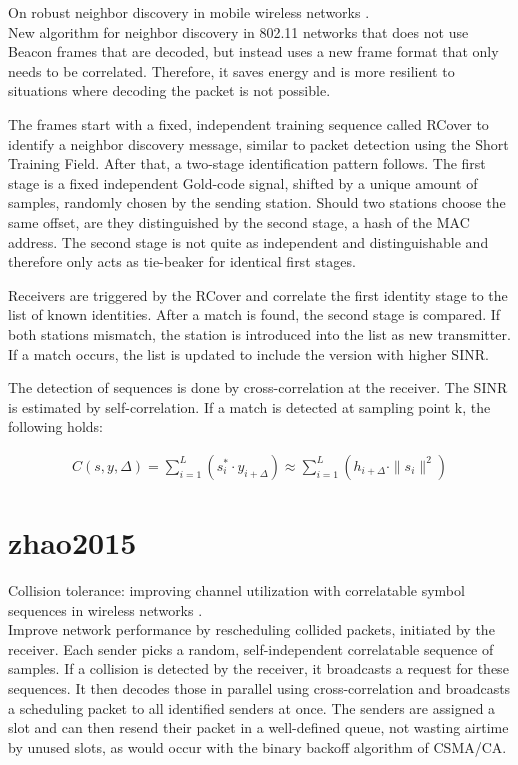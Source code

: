 On robust neighbor discovery in mobile wireless networks \cite{meng2015}.\\

New algorithm for neighbor discovery in 802.11 networks that does not use Beacon frames that are decoded, but instead uses a new frame format that only needs to be correlated. Therefore, it saves energy and is more resilient to situations where decoding the packet is not possible.

The frames start with a fixed, independent training sequence called RCover to identify a neighbor discovery message, similar to packet detection using the Short Training Field. After that, a two-stage identification pattern follows. The first stage is a fixed independent Gold-code signal, shifted by a unique amount of samples, randomly chosen by the sending station. Should two stations choose the same offset, are they distinguished by the second stage, a hash of the MAC address. The second stage is not quite as independent and distinguishable and therefore only acts as tie-beaker for identical first stages.

Receivers are triggered by the RCover and correlate the first identity stage to the list of known identities. After a match is found, the second stage is compared. If both stations mismatch, the station is introduced into the list as new transmitter. If a match occurs, the list is updated to include the version with higher SINR.

The detection of sequences is done by cross-correlation at the receiver. The SINR is estimated by self-correlation. If a match is detected at sampling point k, the following holds:

\begin{align}
	C(s,y,\Delta) = \sum_{i=1}^L (s_i^* \cdot y_{i+\Delta}) \approx \sum_{i=1}^L (h_{i+\Delta} \cdot \|s_i\|^2)
	\label{eqn:correlation}
\end{align}



\section*{zhao2015}

Collision tolerance: improving channel utilization with correlatable symbol sequences in wireless networks \cite{zhao2015}.\\

Improve network performance by rescheduling collided packets, initiated by the receiver. Each sender picks a random, self-independent correlatable sequence of samples. If a collision is detected by the receiver, it broadcasts a request for these sequences. It then decodes those in parallel using cross-correlation and broadcasts a scheduling packet to all identified senders at once. The senders are assigned a slot and can then resend their packet in a well-defined queue, not wasting airtime by unused slots, as would occur with the binary backoff algorithm of CSMA/CA.



